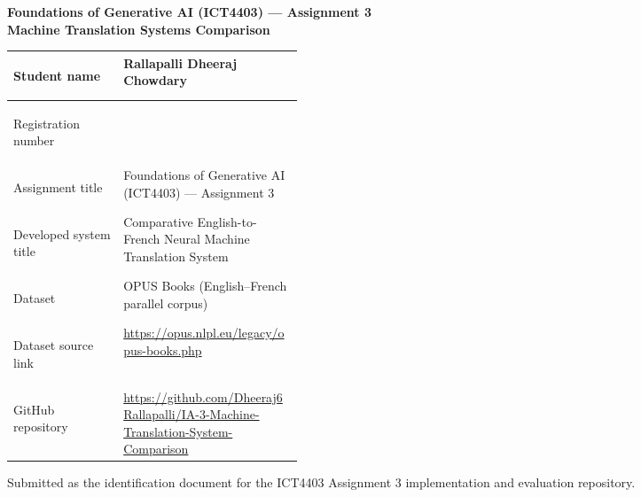 \documentclass[11pt]{article}
\begin{document}
\begin{center}
{\LARGE\bfseries Foundations of Generative AI (ICT4403) --- Assignment 3}\\[8pt]
{\Large\bfseries Machine Translation Systems Comparison}
\end{center}

\vspace{18pt}
\begin{tabularx}{\linewidth}{|>{\bfseries\raggedright\arraybackslash}p{0.38\linewidth}|>{\raggedright\arraybackslash}X|}
\hline
Student name & Rallapalli Dheeraj Chowdary \\
\hline
Registration number & 230911530 \\
\hline
Assignment title & Foundations of Generative AI (ICT4403) --- Assignment 3 \\
\hline
Developed system title & Comparative English-to-French Neural Machine Translation System \\
\hline
Dataset & OPUS Books (English--French parallel corpus) \\
\hline
Dataset source link & \url{https://opus.nlpl.eu/legacy/opus-books.php} \\
\hline
GitHub repository & \url{https://github.com/Dheeraj6Rallapalli/IA-3-Machine-Translation-System-Comparison} \\
\hline
\end{tabularx}

\vspace{18pt}
Submitted as the identification document for the ICT4403 Assignment 3 implementation and evaluation repository.
\end{document}
